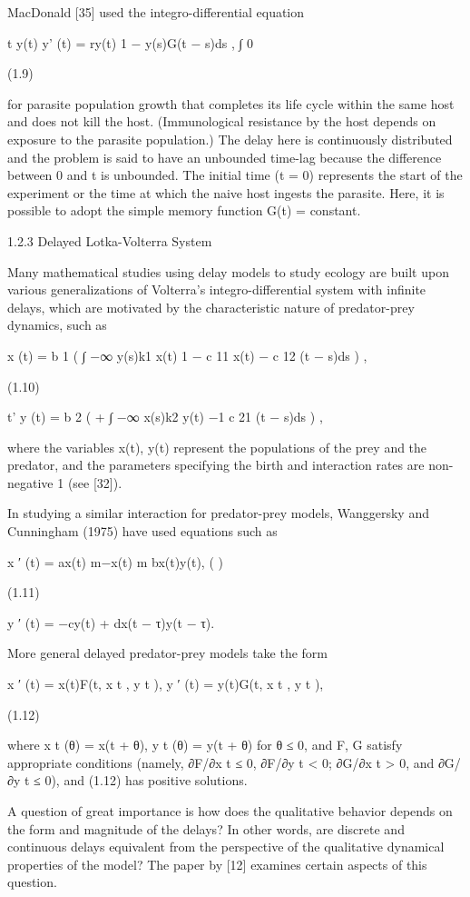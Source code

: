 \documentclass[12pt]{article}
\begin{document}
MacDonald [35] used the integro-differential equation

t y(t) y' (t) = ry(t) 1 − y(s)G(t − s)ds , {  ∫ 0 }

(1.9)

for parasite population growth that completes its life cycle within the same host and does not kill the host. (Immunological resistance by 
the host depends on exposure to the parasite population.) The delay here is continuously distributed and the problem is said to have an 
unbounded time-lag because the difference between 0 and t is unbounded. The initial time (t = 0) represents the start of the experiment or 
the time at which the naive host ingests the parasite. Here, it is possible to adopt the simple memory function G(t) = constant.

1.2.3 Delayed Lotka-Volterra System

Many mathematical studies using delay models to study ecology are built upon various generalizations of Volterra’s integro-differential 
system with infinite delays, which are motivated by the characteristic nature of predator-prey dynamics, such as

x (t) = b 1 ( ∫ −∞ y(s)k1 x(t) 1 − c 11 x(t) − c 12 (t − s)ds ) ,

(1.10)

t' y (t) = b 2 ( + ∫ −∞ x(s)k2 y(t) −1 c 21 (t − s)ds ) ,

where the variables x(t), y(t) represent the populations of the prey and the predator, and the parameters specifying the birth and 
interaction rates are non-negative 1 (see [32]).

In studying a similar interaction for predator-prey models, Wanggersky and Cunningham (1975) have used equations such as

x ′ (t) = ax(t) m−x(t) m bx(t)y(t), ( )

(1.11)

y ′ (t) = −cy(t) + dx(t − τ)y(t − τ).

More general delayed predator-prey models take the form

x ′ (t) = x(t)F(t, x t , y t ), y ′ (t) = y(t)G(t, x t , y t ),

(1.12)

where x t (θ) = x(t + θ), y t (θ) = y(t + θ) for θ ≤ 0, and F, G satisfy appropriate conditions (namely, ∂F/∂x t ≤ 0, ∂F/∂y t < 0; 
∂G/∂x t > 0, and ∂G/∂y t ≤ 0), and (1.12) has positive solutions.

A question of great importance is how does the qualitative behavior depends on the form and magnitude of the delays? In other words, are 
discrete and continuous delays equivalent from the perspective of the qualitative dynamical properties of the model? The paper by [12] 
examines certain aspects of this question.
\end{document}
